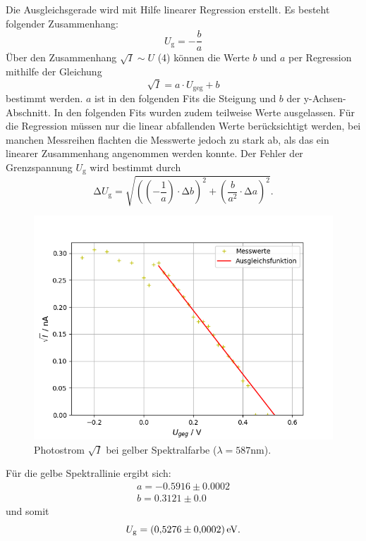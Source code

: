 Die Ausgleichsgerade wird mit Hilfe linearer Regression erstellt. Es besteht folgender Zusammenhang:
\begin{equation}
	U_\text{g} = -\frac{b}{a}
\end{equation}
Über den Zusammenhang $\sqrt{I} \sim U$ (4) können die Werte $b$ und $a$ per Regression mithilfe der Gleichung
\begin{equation*}
	\sqrt{I} = a \cdot U_\text{geg} + b
\end{equation*}
bestimmt werden.
$a$ ist in den folgenden Fits die Steigung und $b$ der y-Achsen-Abschnitt.
In den folgenden Fits wurden zudem teilweise Werte ausgelassen. Für die Regression müssen nur die linear abfallenden Werte berücksichtigt werden, bei manchen Messreihen flachten die Messwerte jedoch zu stark ab, als das ein linearer Zusammenhang angenommen werden konnte.  
Der Fehler der Grenzspannung $U_\text{g}$ wird bestimmt durch
\begin{equation}
	\increment U_\text{g} = \sqrt{\left(\left(-\frac{1}{a}\right)\cdot \increment b \right)^2 + \left(\frac{b}{a^2}\cdot \increment a \right)^2} .
\end{equation}

\begin{figure}[H]
    \centering
    \includegraphics[scale=0.7]{Auswertung/aGelb.png}
    \caption{Photostrom $\sqrt{I}$ bei gelber Spektralfarbe ($\lambda = 587 \text{nm}$).}
    \label{fig:gelb}
\end{figure}
Für die gelbe Spektrallinie ergibt sich:
\begin{gather*}
	a =  -0.5916 \pm 0.0002\\
	b =  0.3121 \pm 0.0
\end{gather*}
und somit 
\begin{equation*}
	U_\text{g} = \SI{0,5276 \pm 0,0002}{\eV} .
\end{equation*}
	
